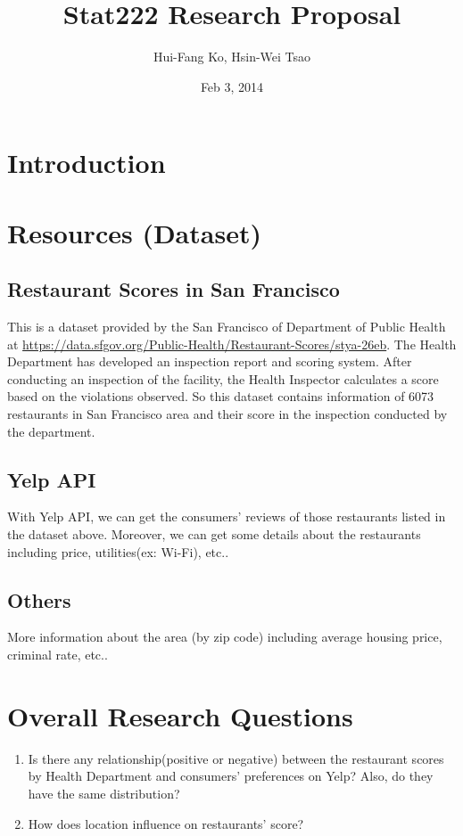 \documentclass{article}
\title{Stat222 Research Proposal}
\author{Hui-Fang Ko, Hsin-Wei Tsao}
\date{Feb 3, 2014}
\begin{document}
\maketitle

\section{Introduction}




\section{Resources (Dataset)}
\subsection{Restaurant Scores in San Francisco}
This is a dataset provided by the San Francisco of Department of Public Health at \url{https://data.sfgov.org/Public-Health/Restaurant-Scores/stya-26eb}. The Health Department has developed an inspection report and scoring system. After conducting an inspection of the facility, the Health Inspector calculates a score based on the violations observed. So this dataset contains information of 6073 restaurants in San Francisco area and their score in the inspection conducted by the department.

\subsection{Yelp API}
With Yelp API, we can get the consumers' reviews of those restaurants listed in the dataset above. Moreover, we can get some details about the restaurants including price, utilities(ex: Wi-Fi), etc.. 

\subsection{Others}
More information about the area (by zip code) including average housing price, criminal rate, etc..

\section{Overall Research Questions}

\begin{enumerate}
  \item Is there any relationship(positive or negative) between the restaurant scores by Health Department and consumers' preferences on Yelp? Also, do they have  the same distribution?
  \item How does location influence on restaurants' score?
\end{enumerate}
\end{document}
